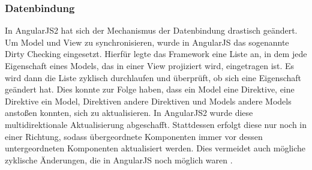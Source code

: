 \subsubsection{Datenbindung}

In AngularJS2 hat sich der Mechanismus der Datenbindung drastisch geändert. Um Model und View zu synchronisieren, wurde in AngularJS das sogenannte Dirty Checking eingesetzt. Hierfür legte das Framework eine Liste an, in dem jede Eigenschaft eines Models, das in einer View projiziert wird, eingetragen ist. Es wird dann die Liste zyklisch durchlaufen und überprüft, ob sich eine Eigenschaft geändert hat. Dies konnte zur Folge haben, dass ein Model eine Direktive, eine Direktive ein Model, Direktiven andere Direktiven und Models andere Models anstoßen konnten, sich zu aktualisieren. In AngularJS2 wurde diese multidirektionale Aktualisierung abgeschafft. Stattdessen erfolgt diese nur noch in einer Richtung, sodass übergeordnete Komponenten immer vor dessen untergeordneten Komponenten aktualisiert werden. Dies vermeidet auch mögliche zyklische Änderungen, die in AngularJS noch möglich waren \cite[S. 144 ff.]{Rangle.io2016}.
